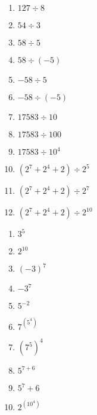 \exer{}
\setcounter{numques}{0}

\begin{multicols}{2}
  \begin{enumerate}[label=\emph{\alph*)}]
    \item $127 \div 8$
    \item $54 \div 3$
    \item $58 \div 5$
    \item $58 \div (-5)$
    \item $-58 \div 5$
    \item $-58 \div (-5)$
    \item $17583 \div 10$
    \item $17583 \div 100$
    \item $17583 \div 10^4$
    \item $(2^7+2^4+2) \div 2^5$
    \item $(2^7+2^4+2) \div 2^7$
    \item $(2^7+2^4+2) \div 2^{10}$
  \end{enumerate}
\end{multicols}
\begin{multicols}{2}
  \begin{enumerate}[label=\emph{\alph*)}]
    \item $3^5$
    \item $2^{10}$
    \item $(-3)^7$
    \item $-3^7$
    \item $5^{-2}$
    \item $7^{\left(5^4\right)}$
    \item $\left(7^5\right)^4$
    \item $5^{7+6}$
    \item $5^7+6$
    \item $2^{\left(10^4\right)}$
  \end{enumerate}
\end{multicols}

